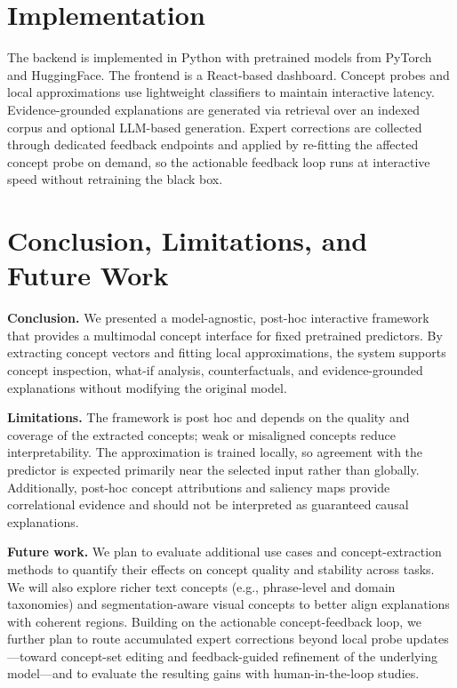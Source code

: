 \documentclass[sigconf,review,screen]{acmart}
\begin{document}
\section{Implementation}
The backend is implemented in Python with pretrained models from PyTorch and HuggingFace. The frontend is a React-based dashboard. Concept probes and local approximations use lightweight classifiers to maintain interactive latency. Evidence-grounded explanations are generated via retrieval over an indexed corpus and optional LLM-based generation. Expert corrections are collected through dedicated feedback endpoints and applied by re-fitting the affected concept probe on demand, so the actionable feedback loop runs at interactive speed without retraining the black box.

\section{Conclusion, Limitations, and Future Work}

\textbf{Conclusion.} We presented a model-agnostic, post-hoc interactive framework that provides a multimodal concept interface for fixed pretrained predictors. By extracting concept vectors and fitting local approximations, the system supports concept inspection, what-if analysis, counterfactuals, and evidence-grounded explanations without modifying the original model.

\noindent\textbf{Limitations.} The framework is post hoc and depends on the quality and coverage of the extracted concepts; weak or misaligned concepts reduce interpretability. The approximation is trained locally, so agreement with the predictor is expected primarily near the selected input rather than globally. Additionally, post-hoc concept attributions and saliency maps provide correlational evidence and should not be interpreted as guaranteed causal explanations.

\noindent\textbf{Future work.} We plan to evaluate additional use cases and concept-extraction methods to quantify their effects on concept quality and stability across tasks. We will also explore richer text concepts (e.g., phrase-level and domain taxonomies) and segmentation-aware visual concepts to better align explanations with coherent regions. Building on the actionable concept-feedback loop, we further plan to route accumulated expert corrections beyond local probe updates---toward concept-set editing and feedback-guided refinement of the underlying model---and to evaluate the resulting gains with human-in-the-loop studies.







\end{document}
